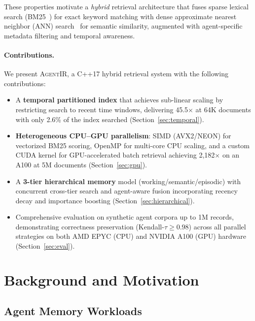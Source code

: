 \documentclass[sigconf,nonacm,anonymous]{acmart}
\newcommand{\sysname}{\textsc{AgentIR}}
\newcommand{\speedup}[1]{#1$\times$}
\begin{document}
These properties motivate a \emph{hybrid} retrieval architecture that
fuses sparse lexical search (BM25~\cite{robertson1994okapi,robertson2009bm25})
for exact keyword matching with dense approximate nearest neighbor
(ANN) search~\cite{malkov2020hnsw} for semantic similarity, augmented
with agent-specific metadata filtering and temporal awareness.

\paragraph{Contributions.} We present \sysname{}, a C++17 hybrid
retrieval system with the following contributions:

\begin{itemize}
\item A \textbf{temporal partitioned index} that achieves sub-linear
  scaling by restricting search to recent time windows, delivering
  \speedup{45.5} at 64K documents with only 2.6\% of the index
  searched (Section~\ref{sec:temporal}).

\item \textbf{Heterogeneous CPU--GPU parallelism}: SIMD (AVX2/NEON)
  for vectorized BM25 scoring, OpenMP for multi-core CPU scaling,
  and a custom CUDA kernel for GPU-accelerated batch retrieval
  achieving \speedup{2,182} on an A100 at 5M documents
  (Section~\ref{sec:gpu}).

\item A \textbf{3-tier hierarchical memory} model
  (working/semantic/episodic) with concurrent cross-tier search
  and agent-aware fusion incorporating recency decay and importance
  boosting (Section~\ref{sec:hierarchical}).

\item Comprehensive evaluation on synthetic agent corpora up to
  1M records, demonstrating correctness preservation (Kendall-$\tau
  \geq 0.98$) across all parallel strategies on both AMD EPYC (CPU)
  and NVIDIA A100 (GPU) hardware (Section~\ref{sec:eval}).
\end{itemize}

\section{Background and Motivation}
\label{sec:background}

\subsection{Agent Memory Workloads}
\end{document}
